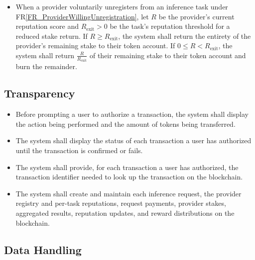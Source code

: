 \documentclass[12pt]{article}
\newcounter{reqnum} %
\newcommand{\rref}[1]{FR\ref{#1}}
\begin{document}
\begin{itemize}
\item[FR\refstepcounter{reqnum}\thereqnum \label{FR_ProviderUnregistrationStakeReturn}:] When a provider voluntarily unregisters from an inference task under \rref{FR_ProviderWillingUnregistration}, let $R$ be the provider's current reputation score and $R_{\text{exit}} > 0$ be the task's reputation threshold for a reduced stake return. If $R \ge R_{\text{exit}}$, the system shall return the entirety of the provider's remaining stake to their token account. If $0 \le R < R_{\text{exit}}$, the system shall return $\frac{R}{R_{\text{exit}}}$ of their remaining stake to their token account and burn the remainder.
\end{itemize}

\subsection{Transparency}

\noindent \begin{itemize}

\item[FR\refstepcounter{reqnum}\thereqnum \label{FR_TransactionPreview}:] Before prompting a user to authorize a transaction, the system shall display the action being performed and the amount of tokens being transferred.

\item[FR\refstepcounter{reqnum}\thereqnum \label{FR_TransactionStatus}:] The system shall display the status of each transaction a user has authorized until the transaction is confirmed or fails.

\item[FR\refstepcounter{reqnum}\thereqnum \label{FR_TransactionVerification}:] The system shall provide, for each transaction a user has authorized, the transaction identifier needed to look up the transaction on the blockchain.

\item[FR\refstepcounter{reqnum}\thereqnum \label{FR_OnChainRecords}:] The system shall create and maintain each inference request, the provider registry and per-task reputations, request payments, provider stakes, aggregated results, reputation updates, and reward distributions on the blockchain.

\end{itemize}

\subsection{Data Handling}
\end{document}
